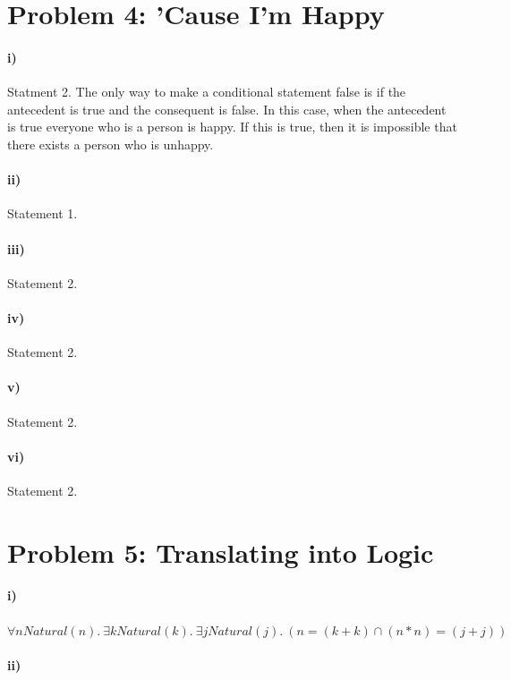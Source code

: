 \documentclass[10pt,letter]{article}
\begin{document}
\section*{Problem 4: 'Cause I'm Happy}

\paragraph{i)} Statment 2. The only way to make a conditional statement false is if the antecedent is true and the consequent is false. In this case, when the antecedent is true everyone who is a person is happy. If this is true, then it is impossible that there exists a person who is unhappy. 

\paragraph{ii)} Statement 1. 

\paragraph{iii)} Statement 2. 

\paragraph{iv)} Statement 2. 

\paragraph{v)} Statement 2. 

\paragraph{vi)} Statement 2.

\section*{Problem 5: Translating into Logic}

\paragraph{i)} $\forall n Natural(n) .\ \exists k Natural(k) .\ \exists j Natural(j) .\ (n = (k + k) \cap (n * n) = (j + j))$

\paragraph{ii)} 
\end{document}
